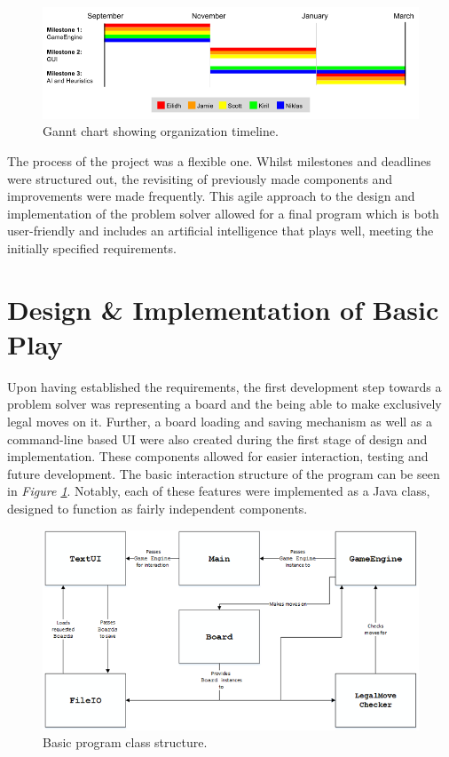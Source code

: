 \documentclass{l3proj}
\begin{document}
\begin{figure}[H]
\centering
\includegraphics[scale=0.5]{Images/GanntChart.png}
\caption{Gannt chart showing organization timeline.}
\end{figure}

The process of the project was a flexible one. Whilst milestones and deadlines were structured out, the revisiting of previously made components and improvements were made frequently. This agile approach to the design and implementation of the problem solver allowed for a final program which is both user-friendly and includes an artificial intelligence that plays well, meeting the initially specified requirements.

\section{Design \& Implementation of Basic Play}

Upon having established the requirements, the first development step towards a problem solver was representing a board and the being able to make exclusively legal moves on it. Further, a board loading and saving mechanism as well as a command-line based UI were also created during the first stage of design and implementation. These components allowed for easier interaction, testing and future development. The basic interaction structure of the program can be seen in \textit{Figure  \ref{fig:basic_program}}. Notably, each of these features were implemented as a Java class, designed to function as fairly independent components.

\begin{figure}[H]
	\centering
	\includegraphics[scale=1]{Images/S33Diagram.png}
	\caption{Basic program class structure.} 
	\label{fig:basic_program}
\end{figure}
\end{document}
